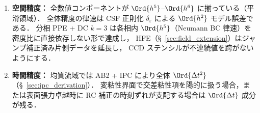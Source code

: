 \begin{tcolorbox}[warnbox, title={精度ミスマッチと設計上のトレードオフ}]
\begin{enumerate}
  \item \textbf{空間精度：}
        全数値コンポーネントが $\Ord{h^5}$--$\Ord{h^6}$ に揃っている（平滑領域）．
        全体精度の律速は CSF 正則化 $\delta_\varepsilon$ による $\Ord{h^2}$ モデル誤差である．
        分相 PPE + DC $k{=}3$ は各相内 $\Ord{h^5}$（Neumann BC 律速）を密度比に直接依存しない形で達成し，
        HFE（§~\ref{sec:field_extension}）はジャンプ補正済み片側データを延長し，
        CCD ステンシルが不連続値を跨がないようにする．

  \item \textbf{時間精度：}
        均質流域では AB2 + IPC により全体 $\Ord{\Delta t^2}$（§~\ref{sec:ipc_derivation}）．
        変粘性界面で交差粘性項を陽的に扱う場合，または表面張力卓越時に
        RC 補正の時刻ずれが支配する場合は $\Ord{\Delta t}$ 成分が残る．
\end{enumerate}
\end{tcolorbox}

